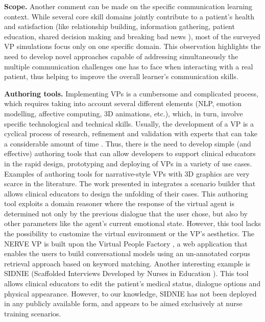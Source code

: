 \textbf{Scope.} Another comment can be made on the specific communication learning context. While several core skill domains jointly contribute to a patient's health and satisfaction (like relationship building, information gathering, patient education, shared decision making and breaking bad news \cite{riedl2017influence}), most of the surveyed VP simulations  focus only on one specific domain. This observation highlights the need to develop novel approaches capable of addressing simultaneously the multiple communication challenges one has to face when interacting with a real patient, thus helping to improve the overall learner's communication skills.


\textbf{Authoring tools.}
Implementing VPs is a cumbersome and complicated process, which requires taking into account several different elements (NLP, emotion modelling, affective computing, 3D animations, etc.), which, in turn, involve specific technological and technical skills. Usually, the development of a VP is a cyclical process of research, refinement and validation with experts that can take a considerable amount of time \cite{rossen2009human}. Thus, there is the need to develop simple (and effective) authoring tools that can allow developers to support clinical educators in the rapid design, prototyping and deploying of VPs in a variety of use cases. 
Examples of authoring tools for narrative-style VPs with 3D graphics are very scarce in the literature. The work presented in \cite{jeuring2015communicate} integrates a scenario builder that allows clinical educators to design the unfolding of their cases. This authoring tool exploits a domain reasoner where the response of the virtual agent is determined not only by the previous dialogue that the user chose, but also by other parameters like the agent's current emotional state. However, this tool lacks the possibility to customize the virtual environment or the VP's aesthetics.
The NERVE VP \cite{hirumi2016advancingPart2,hirumi2016advancing,kleinsmith2015understanding} is built upon the Virtual People Factory \cite{rossen2009human}, a web application that enables the users to build conversational models using an un-annotated corpus retrieval approach based on keyword matching. 
Another interesting example is SIDNIE (Scaffolded Interviews Developed by Nurses in Education \cite{dukes2016participatory}). This tool allows clinical educators to edit the patient's medical status, dialogue options and physical appearance. However, to our knowledge, SIDNIE has not been deployed in any publicly available form, and  appears to be aimed exclusively at nurse training scenarios.

